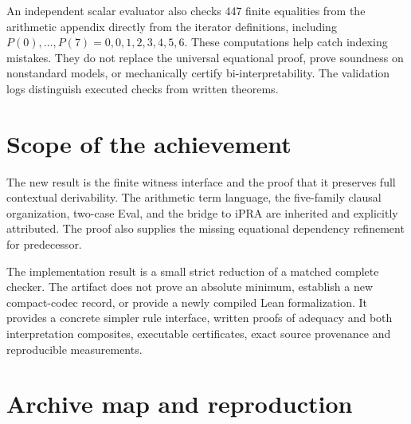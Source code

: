 \documentclass[11pt,letterpaper]{article}
\theoremstyle{definition}
\theoremstyle{remark}
\newcommand{\IPRA}{\mathrm{iPRA}}
\begin{document}
An independent scalar evaluator also checks 447 finite equalities from
the arithmetic appendix directly from the iterator definitions,
including $P(0),\ldots,P(7)=0,0,1,2,3,4,5,6$. These computations help
catch indexing mistakes. They do not replace the universal equational
proof, prove soundness on nonstandard models, or mechanically certify
bi-interpretability. The validation logs distinguish executed checks
from written theorems.

\section{Scope of the achievement}

The new result is the finite witness interface and the proof that it
preserves full contextual derivability. The arithmetic term language,
the five-family clausal organization, two-case Eval, and the bridge to
$\IPRA$ are inherited and explicitly attributed. The proof also supplies
the missing equational dependency refinement for predecessor.

The implementation result is a small strict reduction of a matched
complete checker. The artifact does not prove an absolute minimum,
establish a new compact-codec record, or provide a newly compiled Lean
formalization. It provides a concrete simpler rule interface, written
proofs of adequacy and both interpretation composites, executable
certificates, exact source provenance and reproducible measurements.

\appendix





\section{Archive map and reproduction}
\end{document}
